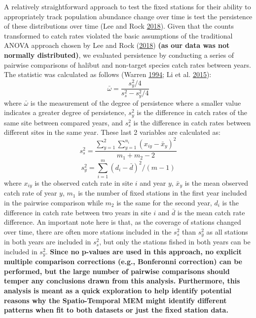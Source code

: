 \documentclass[12pt]{article}\usepackage[]{graphicx}\usepackage[]{color}
\begin{document}
A relatively straightforward approach to test the fixed stations for their ability to appropriately track population abundance change over time is test the persistence of these distributions over time (Lee and Rock \protect\hyperlink{ref-Lee2018}{2018}). Given that the counts transformed to catch rates violated the basic assumptions of the traditional ANOVA approach chosen by Lee and Rock (\protect\hyperlink{ref-Lee2018}{2018}) \textbf{(as our data was not normally distributed)}, we evaluated persistence by conducting a series of pairwise comparisons of halibut and non-target species catch rates between years. The statistic was calculated as follows (Warren \protect\hyperlink{ref-Warren1994}{1994}; Li et al. \protect\hyperlink{ref-Li2015}{2015}):
\begin{equation}
\bar{\omega} = \frac{s^2_y/4}{s^2_s-s^2_y/4}
\end{equation}
where \(\bar{\omega}\) is the measurement of the degree of persistence where a smaller value indicates a greater degree of persistence, \(s^2_y\) is the difference in catch rates of the same site between compared years, and \(s^2_s\) is the difference in catch rates between different sites in the same year. These last 2 variables are calculated as:
\begin{equation}
s^2_s = \frac{\sum_{y=1}^2 \sum_{y=1}^{n_i} (x_{iy}-\bar{x}_y)^2}{m_1+m_2-2}
\end{equation} \begin{equation}
s^2_y = \sum_{i=1}^m (d_i - \bar{d})^2 / (m-1)
\end{equation}
where \(x_{iy}\) is the observed catch rate in site \(i\) and year \(y\), \(\bar{x}_y\) is the mean observed catch rate of year \(y\), \(m_1\) is the number of fixed stations in the first year included in the pairwise comparison while \(m_2\) is the same for the second year, \(d_i\) is the difference in catch rate between two years in site \(i\) and \(\bar{d}\) is the mean catch rate difference. An important note here is that, as the coverage of stations changed over time, there are often more stations included in the \(s^2_s\) than \(s^2_y\) as all stations in both years are included in \(s^2_s\), but only the stations fished in both years can be included in \(s^2_y\). \textbf{Since no p-values are used in this approach, no explicit multiple comparison corrections (e.g., Bonferonni correction) can be performed, but the large number of pairwise comparisons should temper any conclusions drawn from this analysis. Furthermore, this analysis is meant as a quick exploration to help identify potential reasons why the Spatio-Temporal MEM might identify different patterns when fit to both datasets or just the fixed station data.}
\end{document}
